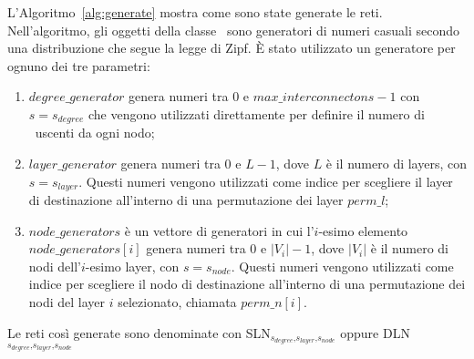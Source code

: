 L'Algoritmo~\vref{alg:generate} mostra come sono state generate le reti.
Nell'algoritmo, gli oggetti della classe \tzgen\ sono generatori di numeri 
casuali secondo una distribuzione che segue la legge di Zipf. È stato utilizzato 
un generatore per ognuno dei tre parametri:
\begin{enumerate}
    \item $\mathit{degree\_generator}$ genera numeri tra 0 e $\mathit{max\_interconnectons} - 1$
        con $s = s_{\mathit{degree}}$ che vengono utilizzati direttamente per definire il 
        numero di \interc\ uscenti da ogni nodo;
    \item $\mathit{layer\_generator}$ genera numeri tra 0 e $L - 1$, dove $L$ è il 
        numero di layers, con $s = s_{\mathit{layer}}$. Questi numeri vengono utilizzati 
        come indice per scegliere il layer di destinazione all'interno di una 
        permutazione dei layer $\mathit{perm\_l}$;
    \item $\mathit{node\_generators}$ è un vettore di generatori in cui 
        l'$i$-esimo elemento $\mathit{node\_generators}[i]$ genera numeri 
        tra 0 e $|V_i| - 1$, dove $|V_i|$ è il numero di nodi dell'$i$-esimo layer, 
        con $s = s_{\mathit{node}}$. Questi numeri vengono utilizzati 
        come indice per scegliere il nodo di destinazione all'interno 
        di una permutazione dei nodi del layer $i$ selezionato, 
        chiamata $\mathit{perm\_n}[i]$.
\end{enumerate}

Le reti così generate sono denominate con 
SLN{\Large$_{ s_{\mathit{degree}}\text{,}s_{\mathit{layer}}\text{,}s_{\mathit{node}}}$}
oppure
DLN{\Large$_{ s_{\mathit{degree}}\text{,}s_{\mathit{layer}}\text{,}s_{\mathit{node}}}$}



  
